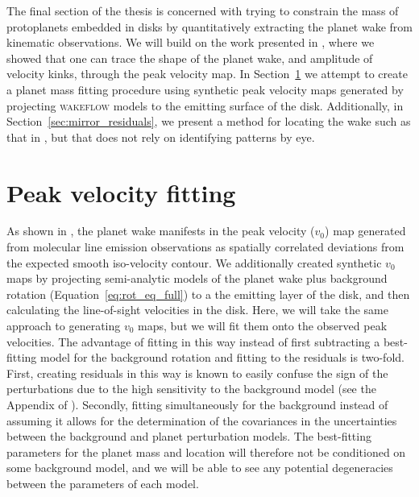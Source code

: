 The final section of the thesis is concerned with trying to constrain the mass of protoplanets embedded in disks by quantitatively extracting the planet wake from kinematic observations.
We will build on the work presented in \citet{calcino2022}, where we showed that one can trace the shape of the planet wake, and amplitude of velocity kinks, through the peak velocity map.
In Section~\ref{sec:v0_fitting} we attempt to create a planet mass fitting procedure using synthetic peak velocity maps generated by projecting \textsc{wakeflow} models to the emitting surface of the disk.
Additionally, in Section~\ref{sec:mirror_residuals}, we present a method for locating the wake such as that in \citet{calcino2022}, but that does not rely on identifying patterns by eye.

\section{Peak velocity fitting} \label{sec:v0_fitting}

As shown in \citet{calcino2022}, the planet wake manifests in the peak velocity ($v_0$) map generated from molecular line emission observations as spatially correlated deviations from the expected smooth iso-velocity contour.
We additionally created synthetic $v_0$ maps by projecting semi-analytic models of the planet wake plus background rotation (Equation~\eqref{eq:rot_eq_full}) to a the emitting layer of the disk, and then calculating the line-of-sight velocities in the disk.
Here, we will take the same approach to generating $v_0$ maps, but we will fit them onto the observed peak velocities.
The advantage of fitting in this way instead of first subtracting a best-fitting model for the background rotation and fitting to the residuals is two-fold.
First, creating residuals in this way is known to easily confuse the sign of the perturbations due to the high sensitivity to the background model (see the Appendix of \citealt{calcino2022}).
Secondly, fitting simultaneously for the background instead of assuming it allows for the determination of the covariances in the uncertainties between the background and planet perturbation models.
The best-fitting parameters for the planet mass and location will therefore not be conditioned on some background model, and we will be able to see any potential degeneracies between the parameters of each model.

